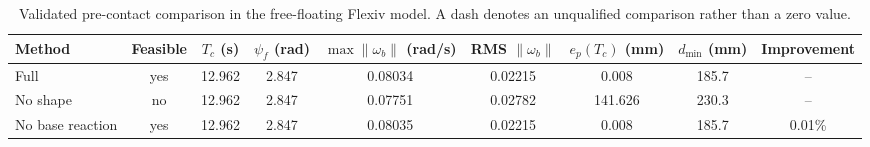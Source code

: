 \begin{table}[t]
\centering
\caption{Validated pre-contact comparison in the free-floating Flexiv model. A dash denotes an unqualified comparison rather than a zero value.}
\label{tab:precontact_comparison}
\begin{tabular}{lcccccccc}
\toprule
Method & Feasible & $T_c$ (s) & $\psi_f$ (rad) & $\max\|\omega_b\|$ (rad/s) & RMS $\|\omega_b\|$ & $e_p(T_c)$ (mm) & $d_{\min}$ (mm) & Improvement \\
\midrule
Full & yes & 12.962 & 2.847 & 0.08034 & 0.02215 & 0.008 & 185.7 & -- \\
No shape & no & 12.962 & 2.847 & 0.07751 & 0.02782 & 141.626 & 230.3 & -- \\
No base reaction & yes & 12.962 & 2.847 & 0.08035 & 0.02215 & 0.008 & 185.7 & 0.01\% \\
\bottomrule
\end{tabular}
\end{table}
